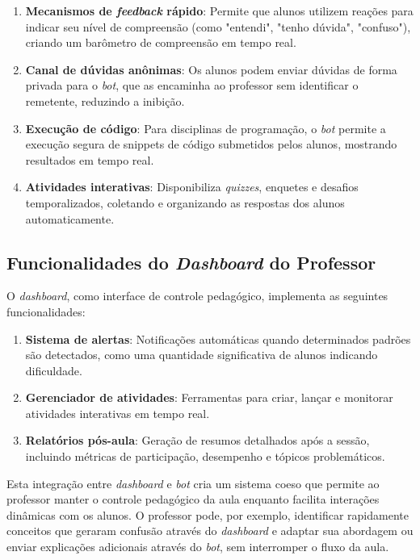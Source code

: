 \begin{enumerate}
\item \textbf{Mecanismos de \textit{feedback} rápido}: Permite que alunos
utilizem reações para indicar seu nível de compreensão (como "entendi", "tenho
dúvida", "confuso"), criando um barômetro de compreensão em tempo real.
\item \textbf{Canal de dúvidas anônimas}: Os alunos podem enviar dúvidas de
forma privada para o \textit{bot}, que as encaminha ao professor sem identificar
o remetente, reduzindo a inibição.
\item \textbf{Execução de código}: Para disciplinas de programação, o
\textit{bot} permite a execução segura de snippets de código submetidos pelos
alunos, mostrando resultados em tempo real.
\item \textbf{Atividades interativas}: Disponibiliza \textit{quizzes}, enquetes
e desafios temporalizados, coletando e organizando as respostas dos alunos
automaticamente.
\end{enumerate}

\subsection{Funcionalidades do \textit{Dashboard} do Professor}
O \textit{dashboard}, como interface de controle pedagógico, implementa as
seguintes funcionalidades:

\begin{enumerate}
\item \textbf{Sistema de alertas}: Notificações automáticas quando determinados
padrões são detectados, como uma quantidade significativa de alunos indicando
dificuldade.
\item \textbf{Gerenciador de atividades}: Ferramentas para criar, lançar e
monitorar atividades interativas em tempo real.
\item \textbf{Relatórios pós-aula}: Geração de resumos detalhados após a sessão,
incluindo métricas de participação, desempenho e tópicos problemáticos.
\end{enumerate}

Esta integração entre \textit{dashboard} e \textit{bot} cria um sistema coeso
que permite ao professor manter o controle pedagógico da aula enquanto facilita
interações dinâmicas com os alunos. O professor pode, por exemplo, identificar
rapidamente conceitos que geraram confusão através do \textit{dashboard} e
adaptar sua abordagem ou enviar explicações adicionais através do \textit{bot},
sem interromper o fluxo da aula.

